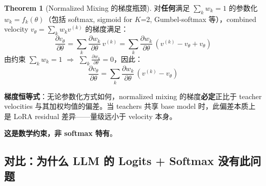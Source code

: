 \documentclass[11pt,a4paper]{article}
\theoremstyle{definition}
\newtheorem{theorem}{Theorem}
\begin{document}
\begin{theorem}[Normalized Mixing 的梯度瓶颈]
\label{thm:fundamental_limit}
对\textbf{任何}满足 $\sum_k w_k = 1$ 的参数化 $w_k = f_k(\theta)$（包括 softmax, sigmoid for $K$=2, Gumbel-softmax 等），combined velocity $v_\theta = \sum_k w_k v^{(k)}$ 的梯度满足：
\begin{equation}
\frac{\partial v_\theta}{\partial \theta} = \sum_k \frac{\partial w_k}{\partial \theta}\, v^{(k)} = \sum_k \frac{\partial w_k}{\partial \theta}\, (v^{(k)} - v_\theta + v_\theta)
\end{equation}
由约束 $\sum_k w_k = 1$ $\Rightarrow$ $\sum_k \frac{\partial w_k}{\partial \theta} = 0$，因此：
\begin{equation}
\boxed{
\frac{\partial v_\theta}{\partial \theta} = \sum_k \frac{\partial w_k}{\partial \theta}\, (v^{(k)} - v_\theta)
}
\label{eq:normalized_constraint}
\end{equation}

\textbf{梯度恒等式}：无论参数化方式如何，normalized mixing 的梯度\textbf{必定}正比于 teacher velocities 与其加权均值的偏差。当 teachers 共享 base model 时，此偏差本质上是 LoRA residual 差异——量级远小于 velocity 本身。

\textbf{这是数学约束，非 softmax 特有}。
\end{theorem}

\subsection{对比：为什么 LLM 的 Logits + Softmax 没有此问题}
\end{document}
